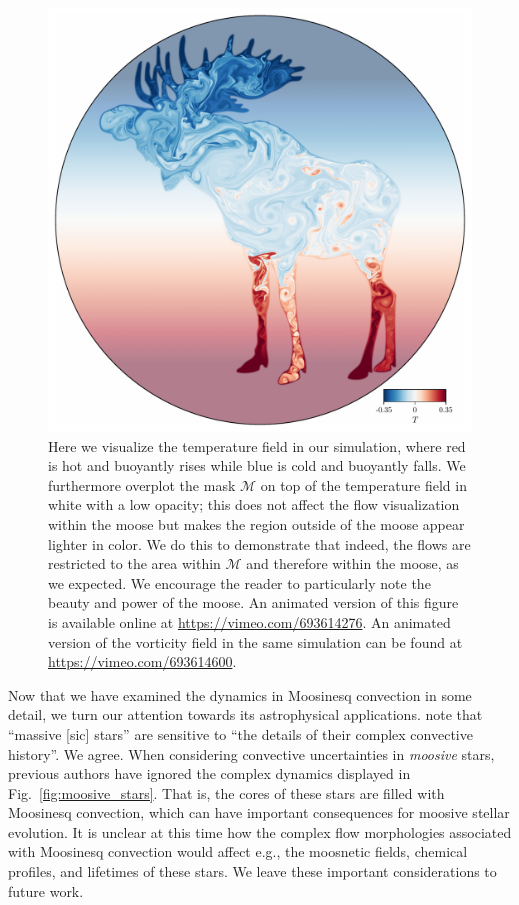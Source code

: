 \begin{figure}[tp!]
\centering
    \includegraphics[width=\textwidth]{paper_figure02.pdf}
\caption{ 
    Here we visualize the temperature field in our simulation, where red is hot and buoyantly rises while blue is cold and buoyantly falls.
    We furthermore overplot the mask $\mathcal{M}$ on top of the temperature field in white with a low opacity; this does not affect the flow visualization within the moose but makes the region outside of the moose appear lighter in color.
    We do this to demonstrate that indeed, the flows are restricted to the area within $\mathcal{M}$ and therefore within the moose, as we expected.
    We encourage the reader to particularly note the beauty and power of the moose.
    An animated version of this figure is available online at \url{https://vimeo.com/693614276}.
    An animated version of the vorticity field in the same simulation can be found at \url{https://vimeo.com/693614600}.
\label{fig:dynamics}
}
\end{figure}

Now that we have examined the dynamics in Moosinesq convection in some detail, we turn our attention towards its astrophysical applications.
\citet{kaiser_etal_2020} note that ``massive [sic] stars'' are sensitive to ``the details of their complex convective history''.
We agree.
When considering convective uncertainties in \emph{moosive} stars, previous authors have ignored the complex dynamics displayed in Fig.~\ref{fig:moosive_stars}.
That is, the cores of these stars are filled with Moosinesq convection, which can have important consequences for moosive stellar evolution.
It is unclear at this time how the complex flow morphologies associated with Moosinesq convection would affect e.g., the moosnetic fields, chemical profiles, and lifetimes of these stars.
We leave these important considerations to future work.

